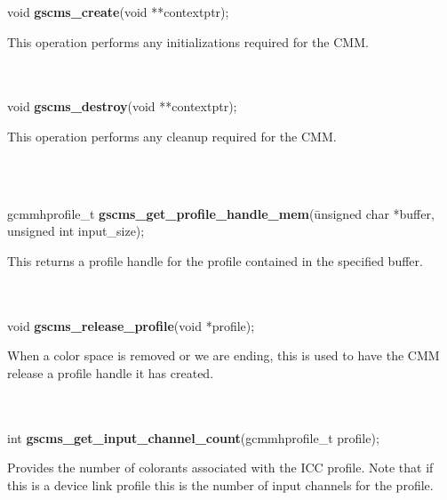 \documentclass[12pt,notitlepage]{article}
\begin{document}
\singlespace

\noindent void {\bf gscms\_create}(void **contextptr);\\

\begin{minipage}[h]{6.0in}
	This operation performs any initializations required for the CMM.
\end{minipage}\\
\\

\noindent void {\bf gscms\_destroy}(void **contextptr);\\

\begin{minipage}[h]{6.0in}
	This operation performs any cleanup required for the CMM.
\end{minipage}\\
\\

\begin{tabbing}
\noindent gcmmhprofile\_t {\bf gscms\_get\_profile\_handle\_mem}(\=unsigned char *buffer, \\
\> unsigned int input\_size);\\
\end{tabbing}

\begin{minipage}[h]{6.0in}
	This returns a profile handle for the profile contained in the specified buffer.
\end{minipage}\\
\\

\noindent void {\bf gscms\_release\_profile}(void *profile);\\

\begin{minipage}[h]{6.0in}
When a color space is removed or we are ending, this is used to have the CMM release a profile handle it has created.
\end{minipage}\\
\\

\noindent int {\bf gscms\_get\_input\_channel\_count}(gcmmhprofile\_t profile);\\

\begin{minipage}[h]{6.0in}
Provides the number of colorants associated with the ICC profile.  Note that if this is a device link profile this is the number of input channels for the profile.
\end{minipage}\\
\\
\end{document}
